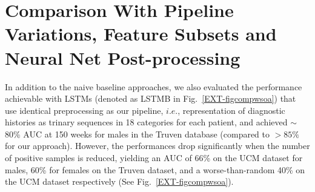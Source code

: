 \documentclass[3p,super,numbers,sort&compress,preprint,10pt]{elsarticle}
\renewcommand{\captionN}[1]{\caption{\color{CadetBlue4!80!black} \sffamily \fontsize{9}{10}\selectfont #1  }}
\begin{document}
 
%  
\section{Comparison With  Pipeline Variations, Feature Subsets and Neural Net Post-processing}\label{sec:pipelinevar}
In addition to the naive baseline approaches, we also evaluated the performance achievable  with LSTMs (denoted as LSTMB in Fig.~\ref{EXT-figcompwsoa}) that use identical preprocessing as our pipeline, $i.e.$, representation of diagnostic histories as trinary sequences in 18 categories for each patient, and achieved $\sim$80\% AUC  at 150 weeks for males in the Truven database (compared to $> 85\%$ for our approach). However, the performances drop significantly when the number of positive samples is reduced, yielding an AUC of 66\% on the UCM dataset for males, 60\% for females on the Truven dataset, and a  worse-than-random 40\% on the UCM dataset respectively (See Fig.~\ref{EXT-figcompwsoa}). 
\end{document}
